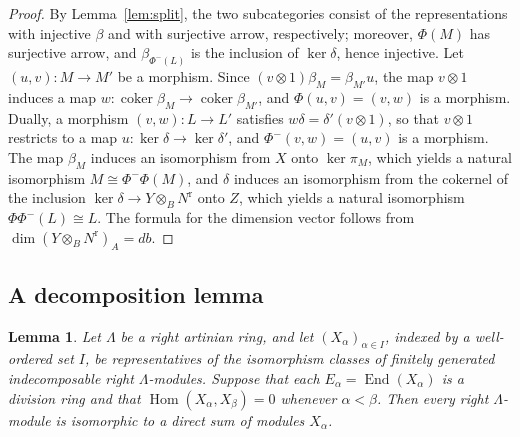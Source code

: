 \documentclass[11pt,a4paper]{amsart}
\newtheorem{lemma}[theorem]{Lemma}
\numberwithin{equation}{section}
\newcommand{\Hom}{\operatorname{Hom}}
\newcommand{\End}{\operatorname{End}}
\newcommand{\coker}{\operatorname{coker}}
\newcommand{\rr}{\mathrm{r}}
\begin{document}
\begin{proof}
By Lemma~\ref{lem:split}, the two subcategories consist of the representations with injective $\beta$ and with surjective arrow, respectively; moreover, $\Phi(M)$ has surjective arrow, and $\beta_{\Phi^-(L)}$ is the inclusion of $\ker\delta$, hence injective. Let $(u,v)\colon M\to M'$ be a morphism. Since $(v\otimes1)\beta_M=\beta_{M'}u$, the map $v\otimes1$ induces a map $w\colon\coker\beta_M\to\coker\beta_{M'}$, and $\Phi(u,v)=(v,w)$ is a morphism. Dually, a morphism $(v,w)\colon L\to L'$ satisfies $w\delta=\delta'(v\otimes1)$, so that $v\otimes1$ restricts to a map $u\colon\ker\delta\to\ker\delta'$, and $\Phi^-(v,w)=(u,v)$ is a morphism. The map $\beta_M$ induces an isomorphism from $X$ onto $\ker\pi_M$, which yields a natural isomorphism $M\cong\Phi^-\Phi(M)$, and $\delta$ induces an isomorphism from the cokernel of the inclusion $\ker\delta\to Y\otimes_BN^{\rr}$ onto $Z$, which yields a natural isomorphism $\Phi\Phi^-(L)\cong L$. The formula for the dimension vector follows from $\dim(Y\otimes_BN^{\rr})_A=db$.
\end{proof}

\subsection{A decomposition lemma}

\begin{lemma}\label{lem:decomp}
Let $\Lambda$ be a right artinian ring, and let $(X_\alpha)_{\alpha\in I}$, indexed by a well-ordered set $I$, be representatives of the isomorphism classes of finitely generated indecomposable right $\Lambda$-modules. Suppose that each $E_\alpha=\End(X_\alpha)$ is a division ring and that $\Hom(X_\alpha,X_\beta)=0$ whenever $\alpha<\beta$. Then every right $\Lambda$-module is isomorphic to a direct sum of modules $X_\alpha$.
\end{lemma}
\end{document}
